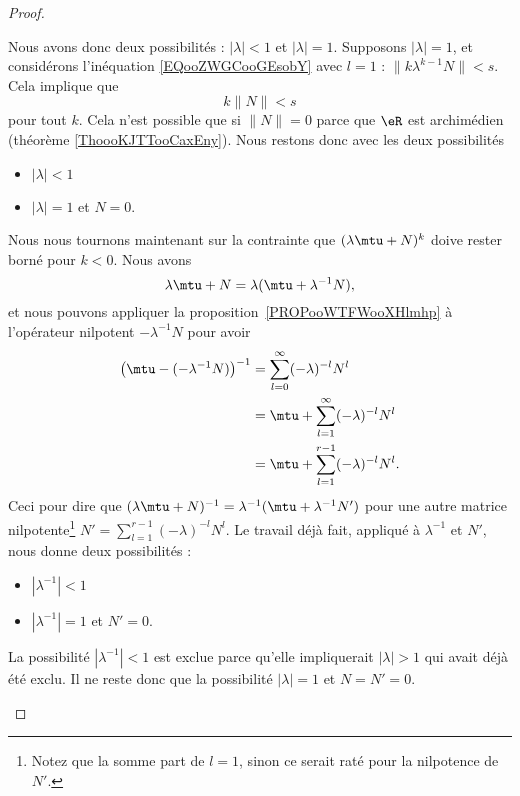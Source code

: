 \begin{proof}
\begin{subproof}
		Nous avons donc deux possibilités : \( | \lambda |<1\) et \( | \lambda |=1\). Supposons \( | \lambda |=1\), et considérons l'inéquation \eqref{EQooZWGCooGEsobY} avec \( l=1\) : \( \| k\lambda^{k-1}N \|<s\). Cela implique que
		\begin{equation}
			k\| N \|<s
		\end{equation}
		pour tout \( k\). Cela n'est possible que si \( \| N \|=0\) parce que \( \eR\) est archimédien (théorème \ref{ThoooKJTTooCaxEny}). Nous restons donc avec les deux possibilités
		\begin{itemize}
			\item \( | \lambda |<1\)
			\item \( | \lambda |=1\) et \( N=0\).
		\end{itemize}

		Nous nous tournons maintenant sur la contrainte que \( (\lambda\mtu+N)^k\) doive rester borné pour \( k<0\). Nous avons
		\begin{equation}
			\lambda\mtu+N=\lambda(\mtu+\lambda^{-1}N),
		\end{equation}
		et nous pouvons appliquer la proposition~\ref{PROPooWTFWooXHlmhp} à l'opérateur nilpotent \( -\lambda^{-1} N\) pour avoir
		\begin{subequations}
			\begin{align}
				\big( \mtu-(-\lambda^{-1}N) \big)^{-1} & =\sum_{l=0}^{\infty}(-\lambda)^{-l}N^l      \\
				                                       & =\mtu+\sum_{l=1}^{\infty}(-\lambda)^{-l}N^l \\
				                                       & =\mtu+\sum_{l=1}^{r-1}(-\lambda)^{-l}N^l.
			\end{align}
		\end{subequations}
		Ceci pour dire que \( (\lambda\mtu+N)^{-1}=\lambda^{-1}(\mtu+\lambda^{-1}N')\) pour une autre matrice nilpotente\footnote{Notez que la somme part de \( l=1\), sinon ce serait raté pour la nilpotence de \( N'\).} \( N'=\sum_{l=1}^{r-1}(-\lambda)^{-l}N^l\). Le travail déjà fait, appliqué à \( \lambda^{-1}\) et \( N'\), nous donne deux possibilités :
		\begin{itemize}
			\item \( | \lambda^{-1} |<1\)
			\item \( | \lambda^{-1} |=1\) et \( N'=0\).
		\end{itemize}
		La possibilité \( | \lambda^{-1} |<1\) est exclue parce qu'elle impliquerait \( | \lambda |>1\) qui avait déjà été exclu. Il ne reste donc que la possibilité \( | \lambda |=1\) et \( N=N'=0\).


\end{subproof}
\end{proof}
